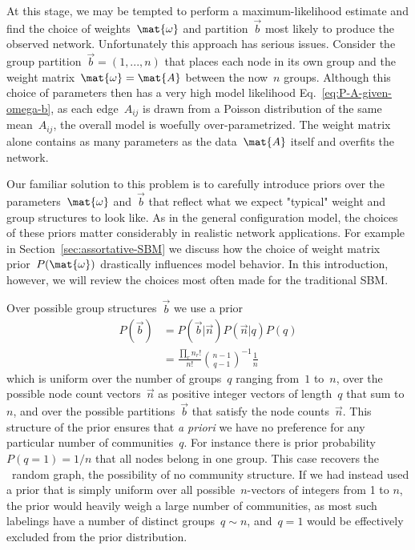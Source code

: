 At this stage, we may be tempted to perform a maximum-likelihood estimate and find the choice of weights~$\mat{\omega}$ and partition~$\vec{b}$ most likely to produce the observed network. Unfortunately this approach has serious issues. Consider the group partition~$\vec{b} = (1,...,n)$ that places each node in its own group and the weight matrix~$\mat{\omega} = \mat{A}$ between the now~$n$ groups. Although this choice of parameters then has a very high model likelihood Eq.~\eqref{eq:P-A-given-omega-b}, as each edge~$A_{ij}$ is drawn from a Poisson distribution of the same mean~$A_{ij}$, the overall model is woefully over-parametrized. The weight matrix alone contains as many parameters as the data~$\mat{A}$ itself and overfits the network.

Our familiar solution to this problem is to carefully introduce priors over the parameters~$\mat{\omega}$ and~$\vec{b}$ that reflect what we expect "typical" weight and group structures to look like. As in the general configuration model, the choices of these priors matter considerably in realistic network applications. For example in Section~\ref{sec:assortative-SBM} we discuss how the choice of weight matrix prior~$P(\mat{\omega})$ drastically influences model behavior. In this introduction, however, we will review the choices most often made for the traditional SBM. 

Over possible group structures~$\vec{b}$ we use a prior
\begin{align}
    P(\vec{b}) &= P(\vec{b}|\vec{n})P(\vec{n}|q)P(q) \nonumber \\
    &= \frac{\prod_r n_r!}{n!} \binom{n-1}{q-1}^{-1}\frac{1}{n} \label{eq:P-b}
\end{align}
which is uniform over the number of groups~$q$ ranging from~$1$ to~$n$, over the possible node count vectors~$\vec{n}$ as positive integer vectors of length~$q$ that sum to~$n$, and over the possible partitions~$\vec{b}$ that satisfy the node counts~$\vec{n}$. This structure of the prior ensures that \textit{a priori} we have no preference for any particular number of communities~$q$. For instance there is prior probability~$P(q = 1) = 1/n$ that all nodes belong in one group. This case recovers the \ER~random graph, the possibility of no community structure. If we had instead used a prior that is simply uniform over all possible~$n$-vectors of integers from 1 to $n$, the prior would heavily weigh a large number of communities, as most such labelings have a number of distinct groups~$q \sim n$, and~$q = 1$ would be effectively excluded from the prior distribution.

